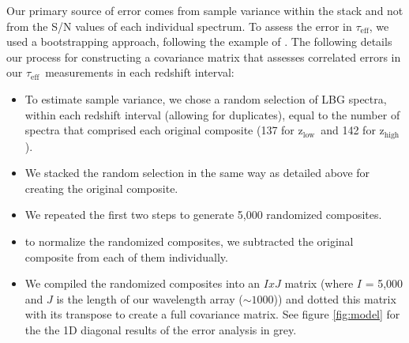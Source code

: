\documentclass[twocolumn,tight,times]{aastex63}
\newcommand{\mteff}{\tau_\mathrm{eff}}
\newcommand{\teff}{$\mteff$}
\newcommand{\hiz}{$\mathrm{z_{high}}$}
\newcommand{\loz}{$\mathrm{z_{low}}$}
\begin{document}
Our primary source of error comes from sample variance within the stack and not from the S/N values of each individual spectrum. To assess the error in \teff, we used a bootstrapping approach, following the example of \cite{Worseck_2014}. The following details our process for constructing a covariance matrix that assesses correlated errors in our \teff\ measurements in each redshift interval:
\begin{itemize}
    \item To estimate sample variance, we chose a random selection of LBG spectra, within each redshift interval (allowing for duplicates), equal to the number of spectra that comprised each original composite (137 for \loz\ and 142 for \hiz).

    \item We stacked the random selection in the same way as detailed above for creating the original composite.
    
    \item We repeated the first two steps to generate 5,000 randomized composites.
    
    \item to normalize the randomized composites, we subtracted the original composite from each of them individually.
    
    \item We compiled the randomized composites into an $I x J$ matrix (where $I$ = 5,000 and $J$ is the length of our wavelength array ($\sim 1000$)) and dotted this matrix with its transpose to create a full covariance matrix. See figure \ref{fig:model} for the the 1D diagonal results of the error analysis in grey. 
\end{itemize}
\end{document}
